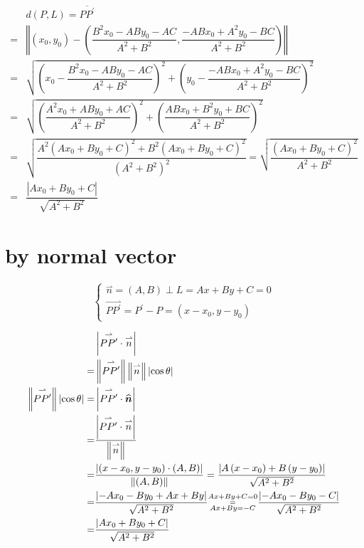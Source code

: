 \documentclass[
]{book}
\theoremstyle{definition}
\theoremstyle{definition}
\theoremstyle{definition}
\theoremstyle{definition}
\theoremstyle{remark}
\begin{document}
\[
\begin{aligned}
 & d\left(P,L\right)=\overline{PP^{\prime}}\\
= & \left\Vert \left(x_{0},y_{0}\right)-\left(\dfrac{B^{2}x_{0}-ABy_{0}-AC}{A^{2}+B^{2}},\dfrac{-ABx_{0}+A^{2}y_{0}-BC}{A^{2}+B^{2}}\right)\right\Vert \\
= & \sqrt{\left(x_{0}-\dfrac{B^{2}x_{0}-ABy_{0}-AC}{A^{2}+B^{2}}\right)^{2}+\left(y_{0}-\dfrac{-ABx_{0}+A^{2}y_{0}-BC}{A^{2}+B^{2}}\right)^{2}}\\
= & \sqrt{\left(\dfrac{A^{2}x_{0}+ABy_{0}+AC}{A^{2}+B^{2}}\right)^{2}+\left(\dfrac{ABx_{0}+B^{2}y_{0}+BC}{A^{2}+B^{2}}\right)^{2}}\\
= & \sqrt{\dfrac{A^{2}\left(Ax_{0}+By_{0}+C\right)^{2}+B^{2}\left(Ax_{0}+By_{0}+C\right)^{2}}{\left(A^{2}+B^{2}\right)^{2}}}=\sqrt{\dfrac{\left(Ax_{0}+By_{0}+C\right)^{2}}{A^{2}+B^{2}}}\\
= & \dfrac{\left|Ax_{0}+By_{0}+C\right|}{\sqrt{A^{2}+B^{2}}}
\end{aligned}
\]

\hypertarget{by-normal-vector}{%
\section{by normal vector}\label{by-normal-vector}}

\[
\begin{cases}
\overset{\rightharpoonup}{n}=\left(A,B\right)\perp L=Ax+By+C=0\\
\overset{\rightharpoonup}{PP^{\prime}}=P^{\prime}-P=\left(x-x_{0},y-y_{0}\right)
\end{cases}
\]

\[
\begin{aligned}
 & \left|\overset{\rightharpoonup}{PP^{\prime}}\cdot\overset{\rightharpoonup}{n}\right|\\
= & \left\Vert \overset{\rightharpoonup}{PP^{\prime}}\right\Vert \left\Vert \overset{\rightharpoonup}{n}\right\Vert \left|\cos\theta\right|\\
\left\Vert \overset{\rightharpoonup}{PP^{\prime}}\right\Vert \left|\cos\theta\right|= & \left|\overset{\rightharpoonup}{PP^{\prime}}\cdot\widehat{\boldsymbol{n}}\right|\\
= & \dfrac{\left|\overset{\rightharpoonup}{PP^{\prime}}\cdot\overset{\rightharpoonup}{n}\right|}{\left\Vert \overset{\rightharpoonup}{n}\right\Vert }\\
= & \dfrac{\left|\left(x-x_{0},y-y_{0}\right)\cdot\left(A,B\right)\right|}{\left\Vert \left(A,B\right)\right\Vert }=\dfrac{\left|A\left(x-x_{0}\right)+B\left(y-y_{0}\right)\right|}{\sqrt{A^{2}+B^{2}}}\\
= & \dfrac{\left|-Ax_{0}-By_{0}+Ax+By\right|}{\sqrt{A^{2}+B^{2}}}\begin{subarray}{c}
Ax+By+C=0\\
=\\
Ax+By=-C
\end{subarray}\dfrac{\left|-Ax_{0}-By_{0}-C\right|}{\sqrt{A^{2}+B^{2}}}\\
= & \dfrac{\left|Ax_{0}+By_{0}+C\right|}{\sqrt{A^{2}+B^{2}}}
\end{aligned}
\]
\end{document}
